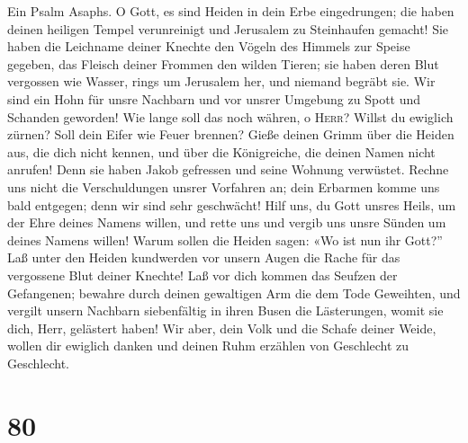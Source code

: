  Ein Psalm Asaphs. O Gott, es sind Heiden in dein Erbe
eingedrungen; die haben deinen heiligen Tempel verunreinigt und
Jerusalem zu Steinhaufen gemacht!  Sie haben die Leichname
deiner Knechte den Vögeln des Himmels zur Speise gegeben, das Fleisch
deiner Frommen den wilden Tieren;  sie haben deren Blut
vergossen wie Wasser, rings um Jerusalem her, und niemand begräbt sie.
 Wir sind ein Hohn für unsre Nachbarn und vor unsrer
Umgebung zu Spott und Schanden geworden!  Wie lange soll
das noch währen, o \textsc{Herr}? Willst du ewiglich zürnen? Soll dein
Eifer wie Feuer brennen?  Gieße deinen Grimm über die
Heiden aus, die dich nicht kennen, und über die Königreiche, die deinen
Namen nicht anrufen!  Denn sie haben Jakob gefressen und
seine Wohnung verwüstet.  Rechne uns nicht die
Verschuldungen unsrer Vorfahren an; dein Erbarmen komme uns bald
entgegen; denn wir sind sehr geschwächt!  Hilf uns, du
Gott unsres Heils, um der Ehre deines Namens willen, und rette uns und
vergib uns unsre Sünden um deines Namens willen!  Warum
sollen die Heiden sagen: «Wo ist nun ihr Gott?'' Laß unter den Heiden
kundwerden vor unsern Augen die Rache für das vergossene Blut deiner
Knechte!  Laß vor dich kommen das Seufzen der Gefangenen;
bewahre durch deinen gewaltigen Arm die dem Tode Geweihten,
 und vergilt unsern Nachbarn siebenfältig in ihren Busen
die Lästerungen, womit sie dich, Herr, gelästert haben! 
Wir aber, dein Volk und die Schafe deiner Weide, wollen dir ewiglich
danken und deinen Ruhm erzählen von Geschlecht zu Geschlecht.

\hypertarget{section-79}{%
\section{80}\label{section-79}}

